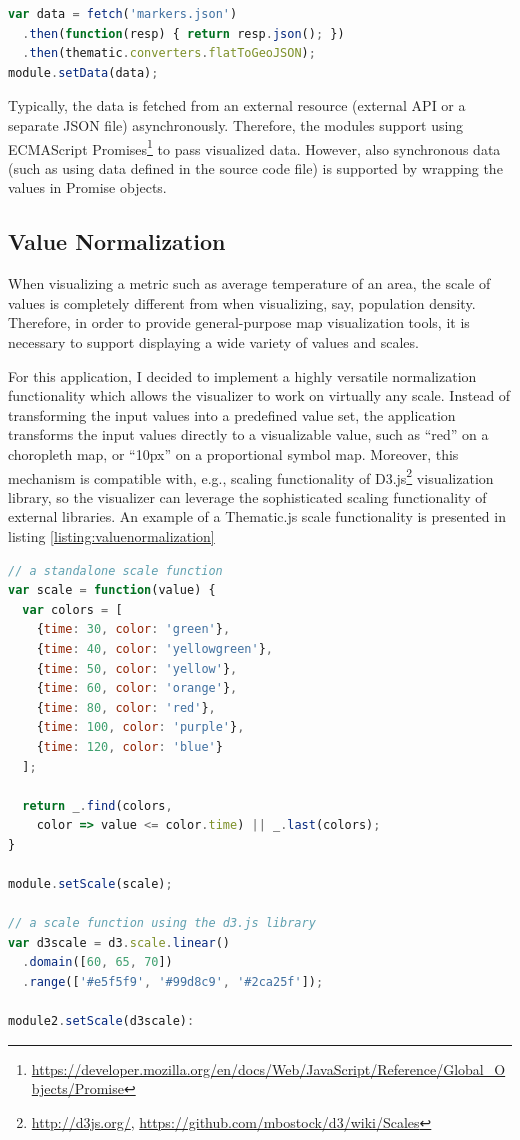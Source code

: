 \begin{lstlisting}[caption=An example code for using the flat dot input format converter.,language=JavaScript,label=listing:inputformats]
var data = fetch('markers.json')
  .then(function(resp) { return resp.json(); })
  .then(thematic.converters.flatToGeoJSON);
module.setData(data);
\end{lstlisting}

Typically, the data is fetched from an external resource (external API or a separate JSON file) asynchronously. Therefore, the modules support using ECMAScript Promises\footnote{\url{https://developer.mozilla.org/en/docs/Web/JavaScript/Reference/Global_Objects/Promise}} to pass visualized data. However, also synchronous data (such as using data defined in the source code file) is supported by wrapping the values in Promise objects.

\subsection{Value Normalization}

When visualizing a metric such as average temperature of an area, the scale of values is completely different from when visualizing, say, population density. Therefore, in order to provide general-purpose map visualization tools, it is necessary to support displaying a wide variety of values and scales.

For this application, I decided to implement a highly versatile normalization functionality which allows the visualizer to work on virtually any scale. Instead of transforming the input values into a predefined value set, the application transforms the input values directly to a visualizable value, such as ``red'' on a choropleth map, or ``10px'' on a proportional symbol map. Moreover, this mechanism is compatible with, e.g., scaling functionality of D3.js\footnote{\url{http://d3js.org/}, \url{https://github.com/mbostock/d3/wiki/Scales}} visualization library, so the visualizer can leverage the sophisticated scaling functionality of external libraries. An example of a Thematic.js scale functionality is presented in listing \ref{listing:valuenormalization}

\begin{lstlisting}[caption=An example of Thematic.js scale functionality.,language=JavaScript,label=listing:valuenormalization]
// a standalone scale function
var scale = function(value) {
  var colors = [
    {time: 30, color: 'green'},
    {time: 40, color: 'yellowgreen'},
    {time: 50, color: 'yellow'},
    {time: 60, color: 'orange'},
    {time: 80, color: 'red'},
    {time: 100, color: 'purple'},
    {time: 120, color: 'blue'}
  ];

  return _.find(colors, 
    color => value <= color.time) || _.last(colors);
}

module.setScale(scale);

// a scale function using the d3.js library
var d3scale = d3.scale.linear()
  .domain([60, 65, 70])
  .range(['#e5f5f9', '#99d8c9', '#2ca25f']);

module2.setScale(d3scale):
\end{lstlisting}

